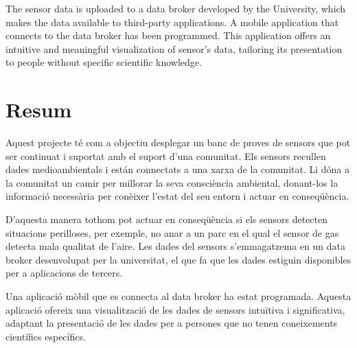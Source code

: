 \documentclass[12pt, a4paper,twoside]{tesi_upf}
\begin{document}
  The sensor data is uploaded to a data broker developed by the University, which makes the data available to third-party applications. 
  A mobile application that connects to the data broker has been programmed. 
  This application offers an intuitive and meaningful visualization of sensor's data, tailoring its presentation to people without specific scientific knowledge.


\section*{\Large \sffamily  Resum}

	Aquest projecte té com a objectiu desplegar un banc de proves de sensors que pot ser continuat i suportat amb el suport d'una comunitat.
	Els sensors recullen dades medioambientals i están connectats a una xarxa de la comunitat. Li dóna a la comunitat un camir per millorar la seva consciència ambiental, donant-los la informació necessària per conèixer l'estat del seu entorn i actuar en conseqüència. 
	
	D'aquesta manera tothom pot actuar en conseqüència si els sensors detecten situacions perilloses, per exemple, no anar a un parc en el qual el sensor de gas detecta mala qualitat de l'aire.
	Les dades del sensors s'emmagatzema en un data broker desenvolupat per la universitat, el que fa que les dades estiguin disponibles per a aplicacions de tercers.
	
	Una aplicació mòbil que es connecta al data broker ha estat programada. 
	Aquesta aplicació ofereix una visualització de les dades de sensors intuïtiva i significativa, adaptant la presentació de les dades per a persones que no tenen coneixements científics específics.


\cleardoublepage

%


\tableofcontents

\listoffigures

\listoftables
\end{document}
